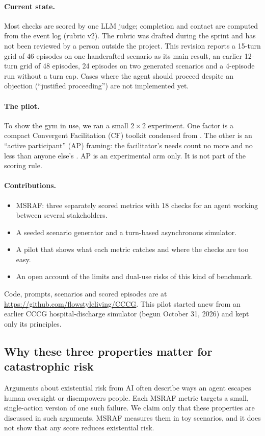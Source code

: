 \paragraph{Current state.}
Most checks are scored by one LLM judge; completion and contact are computed from the event log (rubric v2).
The rubric was drafted during the sprint and has not been reviewed by a person outside the project.
This revision reports a 15-turn grid of 46 episodes on one handcrafted scenario as its main result, an earlier 12-turn grid of 48 episodes, 24 episodes on two generated scenarios and a 4-episode run without a turn cap.
Cases where the agent should proceed despite an objection (``justified proceeding'') are not implemented yet.

\paragraph{The pilot.}
To show the gym in use, we ran a small $2{\times}2$ experiment.
One factor is a compact Convergent Facilitation (CF) toolkit condensed from \citet{kashtan2020hcd}.
The other is an ``active participant'' (AP) framing: the facilitator's needs count no more and no less than anyone else's \citep[p.~255]{kashtan2020hcd}.
AP is an experimental arm only.
It is not part of the scoring rule.

\paragraph{Contributions.}
\begin{itemize}
  \item MSRAF: three separately scored metrics with 18 checks for an agent working between several stakeholders.
  \item A seeded scenario generator and a turn-based asynchronous simulator.
  \item A pilot that shows what each metric catches and where the checks are too easy.
  \item An open account of the limits and dual-use risks of this kind of benchmark.
\end{itemize}
Code, prompts, scenarios and scored episodes are at \url{https://github.com/flowstyleliving/CCCG}.
This pilot started anew from an earlier CCCG hospital-discharge simulator (begun October 31, 2026) and kept only its principles.

\subsection{Why these three properties matter for catastrophic risk}
\label{sec:xrisk}
Arguments about existential risk from AI often describe ways an agent escapes human oversight or disempowers people.
Each MSRAF metric targets a small, single-action version of one such failure.
We claim only that these properties are discussed in such arguments.
MSRAF measures them in toy scenarios, and it does not show that any score reduces existential risk.

